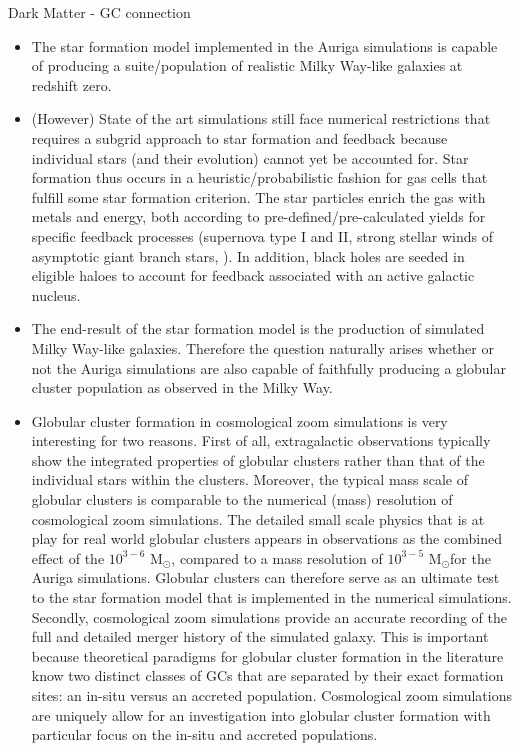 \documentclass[a4paper,fleqn,usenatbib]{mnras}
\newcommand{\Sun}[0]{\ensuremath{_{\odot}}}
\begin{document}
Dark Matter - GC connection

\begin{itemize}
    \item The star formation model implemented in the Auriga simulations is capable of producing a suite/population of realistic Milky Way-like galaxies at redshift zero.
    \item (However) State of the art simulations still face numerical restrictions that requires a subgrid approach to star formation and feedback because individual stars (and their evolution) cannot yet be accounted for. Star formation thus occurs in a heuristic/probabilistic fashion for gas cells that fulfill some star formation criterion. The star particles enrich the gas with metals and energy, both according to pre-defined/pre-calculated yields for specific feedback processes (supernova type I and II, strong stellar winds of asymptotic giant branch stars, ). In addition, black holes are seeded in eligible haloes to account for feedback associated with an active galactic nucleus.
    \item The end-result of the star formation model is the production of simulated Milky Way-like galaxies. Therefore the question naturally arises whether or not the Auriga simulations are also capable of faithfully producing a globular cluster population as observed in the Milky Way.
    \item Globular cluster formation in cosmological zoom simulations is very interesting for two reasons. First of all, extragalactic observations typically show the integrated properties of globular clusters rather than that of the individual stars within the clusters. Moreover, the typical mass scale of globular clusters is comparable to the numerical (mass) resolution of cosmological zoom simulations. The detailed small scale physics that is at play for real world globular clusters appears in observations as the combined effect of the $10^{3-6}$ M\Sun, compared to a mass resolution of $10^{3-5}$ M\Sun for the Auriga simulations. Globular clusters can therefore serve as an ultimate test to the star formation model that is implemented in the numerical simulations. Secondly, cosmological zoom simulations provide an accurate recording of the full and detailed merger history of the simulated galaxy. This is important because theoretical paradigms for globular cluster formation in the literature know two distinct classes of GCs that are separated by their exact formation sites: an in-situ versus an accreted population. Cosmological zoom simulations are uniquely allow for an investigation into globular cluster formation with particular focus on the in-situ and accreted populations.
\end{itemize}
\end{document}
